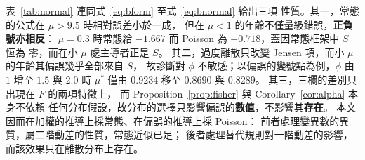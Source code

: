 表~\ref{tab:normal} 連同式~\eqref{eq:bform} 至式~\eqref{eq:bnormal} 給出三項
性質。其一，常態的公式在 $\mu>9.5$ 時相對誤差小於一成，
但在 $\mu<1$ 的年齡不僅量級錯誤，\textbf{正負號亦相反}：
$\mu=0.3$ 時常態給 $-1.667$ 而 Poisson 為 $+0.718$，蓋因常態框架中 $S$ 恆為
零，而在小 $\mu$ 處主導者正是 $S$。
其二，過度離散只改變 Jensen 項，而小 $\mu$ 的年齡其偏誤幾乎全部來自 $S$，
故診斷對 $\phi$ 不敏感；以偏誤的變號點為例，$\phi$ 由 $1$ 增至 $1.5$ 與
$2.0$ 時 $\mu^{\ast}$ 僅由 $0.9234$ 移至 $0.8690$ 與 $0.8289$。
其三，三欄的差別只出現在 $F$ 的兩項特徵上，
而 Proposition~\ref{prop:fisher} 與 Corollary~\ref{cor:alpha} 本身不依賴
任何分布假設，故分布的選擇只影響偏誤的\textbf{數值}，不影響其\textbf{存在}。
本文因而在加權的推導上採常態、在偏誤的推導上採 Poisson：
前者處理變異數的異質，屬二階動差的性質，常態近似已足；
後者處理替代規則對一階動差的影響，而該效果只在離散分布上存在。

